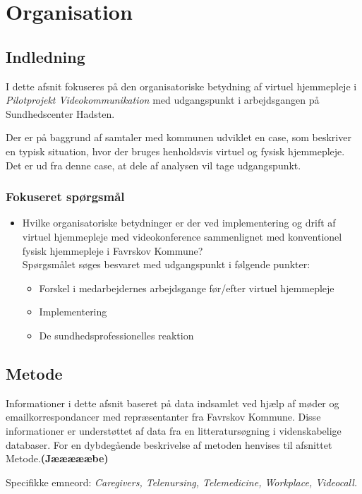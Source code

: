 \chapter{Organisation}

\section{Indledning}
I dette afsnit fokuseres på den organisatoriske betydning af virtuel hjemmepleje i \textit{Pilotprojekt Videokommunikation} med udgangspunkt i arbejdsgangen på Sundhedscenter Hadsten. 

Der er på baggrund af samtaler med kommunen udviklet en case, som beskriver en typisk situation, hvor der bruges henholdsvis virtuel og fysisk hjemmepleje. Det er ud fra denne case, at dele af analysen vil tage udgangspunkt.

\subsection{Fokuseret spørgsmål}

\begin{itemize}
	\item Hvilke organisatoriske betydninger er der ved implementering og drift af virtuel hjemmepleje med videokonference sammenlignet med konventionel fysisk hjemmepleje i Favrskov Kommune? \\Spørgsmålet søges besvaret med udgangspunkt i følgende punkter:
	\begin{itemize}
	\item Forskel i medarbejdernes arbejdsgange før/efter virtuel hjemmepleje
	\item Implementering
	\item De sundhedsprofessionelles reaktion
\end{itemize}
\end{itemize}


\section{Metode}
Informationer i dette afsnit baseret på data indsamlet ved hjælp af møder og emailkorrespondancer med repræsentanter fra Favrskov Kommune. Disse informationer er understøttet af data fra en litteratursøgning i videnskabelige databaser. For en dybdegående beskrivelse af metoden henvises til afsnittet Metode.\textbf{(Jæææææbe)} 

Specifikke emneord: \textit{Caregivers, Telenursing, Telemedicine, Workplace, Videocall.}

